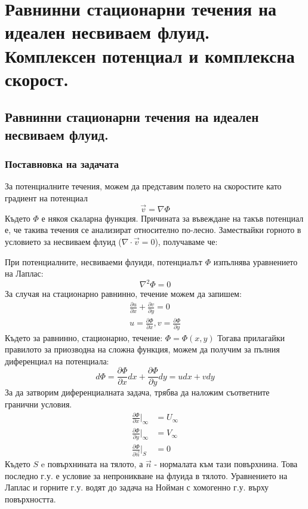 \section{Равнинни стационарни течения на идеален несвиваем флуид. Комплексен потенциал и комплексна скорост.}
\subsection{Равнинни стационарни течения на идеален несвиваем флуид.}
\subsubsection{Поставновка на задачата}
За потенциалните течения, можем да представим полето на скоростите като градиент на потенциал
\begin{equation*}
	\vec{v} = \nabla \Phi
\end{equation*}
Където $\Phi$ е някоя скаларна функция. Причината за въвеждане на такъв потенциал е, че такива течения се анализират относително по-лесно. Замествайки горното в условието за несвиваем флуид ($\nabla \cdot \vec{v} = 0$), получаваме че:

\noindent При потенциалните, несвиваеми флуиди, потенциалът $\Phi$ изпълнява уравнението на Лаплас:
\begin{equation*}
	\nabla^2 \Phi  = 0
\end{equation*}
За случая на стационарно равнинно, течение можем да запишем:
\begin{align}
	\label{eq:planar_flow}
	\frac{\partial u}{\partial x} + \frac{\partial v}{\partial y} = 0 \\
	u = \frac{\partial \Phi}{\partial x}, v = \frac{\partial \Phi}{\partial y}
\end{align}
Където за равнинно, стационарно, течение: $\Phi = \Phi(x,y)$
Тогава прилагайки правилото за приозводна на сложна функция, можем да получим за пълния диференциал на потенциала:
\begin{equation*}
	d \Phi = \frac{\partial \Phi}{\partial x} d x +  \frac{\partial \Phi}{\partial y} dy = u dx + v dy
\end{equation*}
За да затворим диференциалната задача, трябва да наложим съответните гранични условия.
\begin{align*}
	\frac{\partial \Phi}{\partial x} \Bigg|_{\infty}  & = U_{\infty} \\
	\frac{\partial \Phi}{\partial y} \Bigg|_{\infty}  & = V_{\infty} \\
	\frac{\partial \Phi}{\partial \vec{n}} \Bigg|_{S} & = 0
\end{align*}
Където $S$ e повърхнината на тялото, а $\vec{n}$ - нормалата към тази повърхнина. Това последно г.у. е условие за непроникване на
флуида в тялото.
Уравнението на Лаплас и горните г.у. водят до задача на Нойман с хомогенно г.у. върху повърхността.

